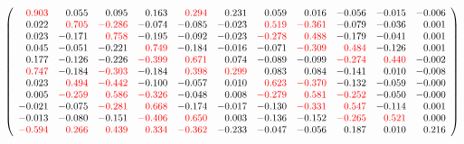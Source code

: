 \documentclass[]{article}
\begin{document}
\[
\left(
\begin{array}{rrrrrrrrrrr}
\color{red} 0.903 & 0.055 & 0.095 & 0.163 & \color{red} 0.294 & 0.231 & 0.059 & 0.016 & -0.056 & -0.015 & -0.006 \\
0.022 & \color{red} 0.705 & \color{red} -0.286 & -0.074 & -0.085 & -0.023 & \color{red} 0.519 & \color{red} -0.361 & -0.079 & -0.036 & 0.001 \\
0.023 & -0.171 & \color{red} 0.758 & -0.195 & -0.092 & -0.023 & \color{red} -0.278 & \color{red} 0.488 & -0.179 & -0.041 & 0.001 \\
0.045 & -0.051 & -0.221 & \color{red} 0.749 & -0.184 & -0.016 & -0.071 & \color{red} -0.309 & \color{red} 0.484 & -0.126 & 0.001 \\
0.177 & -0.126 & -0.226 & \color{red} -0.399 & \color{red} 0.671 & 0.074 & -0.089 & -0.099 & \color{red} -0.274 & \color{red} 0.440 & -0.002 \\
\color{red} 0.747 & -0.184 & \color{red} -0.303 & -0.184 & \color{red} 0.398 & \color{red} 0.299 & 0.083 & 0.084 & -0.141 & 0.010 & -0.008 \\
0.023 & \color{red} 0.494 & \color{red} -0.442 & -0.100 & -0.057 & 0.010 & \color{red} 0.623 & \color{red} -0.370 & -0.132 & -0.059 & -0.000 \\
0.005 & \color{red} -0.259 & \color{red} 0.586 & \color{red} -0.326 & -0.048 & 0.008 & \color{red} -0.279 & \color{red} 0.581 & \color{red} -0.252 & -0.050 & -0.000 \\
-0.021 & -0.075 & \color{red} -0.281 & \color{red} 0.668 & -0.174 & -0.017 & -0.130 & \color{red} -0.331 & \color{red} 0.547 & -0.114 & 0.001 \\
-0.013 & -0.080 & -0.151 & \color{red} -0.406 & \color{red} 0.650 & 0.003 & -0.136 & -0.152 & \color{red} -0.265 & \color{red} 0.521 & 0.000 \\
\color{red} -0.594 & \color{red} 0.266 & \color{red} 0.439 & \color{red} 0.334 & \color{red} -0.362 & -0.233 & -0.047 & -0.056 & 0.187 & 0.010 & 0.216 \\
\end{array}
\right)
\]
\end{document}
